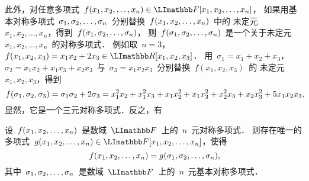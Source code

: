 此外，对任意多项式~$f(\mvec x)\in\mF[\mvec x]$，
如果用基本对称多项式~${\sigma}_1,\allowbreak{\sigma}_2,\allowbreak\dotsc,\allowbreak{\sigma}_{n}$~分别替换~$f({x}_1,\allowbreak{x}_2,\allowbreak\dotsc,\allowbreak{x}_{n})$~中的
未定元~$x_1,x_2,\dotsc,x_n$，得到~$f({\sigma}_1,\allowbreak{\sigma}_2,\allowbreak\dotsc,\allowbreak{\sigma}_{n})$，
则~$f({\sigma}_1,\allowbreak{\sigma}_2,\allowbreak\dotsc,\allowbreak{\sigma}_{n})$~是一个关于未定元~$x_1,x_2,\dotsc,x_n$~的对称多项式．%
例如取~$n=3$，$f(x_1,x_2,x_3)=x_1x_2+2x_3\in\mR[x_1,x_2,x_3]$．%
用~$\sigma_1=x_1+x_2+x_3$，$\sigma_2=x_1x_2+x_1x_3+x_2x_3$~与~$\sigma_3=x_1x_2x_3$~分别替换~$f(x_1,x_2,x_3)$~的
未定元~$x_1,x_2,x_3$，得到
\[
f(\sigma_1,\sigma_2,\sigma_3)=\sigma_1\sigma_2+2\sigma_3=x_1^2x_2+x_1^2x_3+x_1x_2^2+x_1x_3^2+x_2^2x_3+x_2x_3^2+5x_1x_2x_3\cid
\]
显然，它是一个三元对称多项式．反之，有
\begin{theorem}[对称多项式基本定理]\label{sym-pol-onlyone}
设~$f({x}_1,\allowbreak{x}_2,\allowbreak\dotsc,\allowbreak{x}_{n})$~是数域~$\mF$~上的~$n$~元对称多项式．%
则存在唯一的多项式~$g(\mvec x)\in\mF[\mvec x]$，使得
\[
f(\mvec x)=g(\mvec\sigma)\cid
\]
其中~${\sigma}_1,\allowbreak{\sigma}_2,\allowbreak\dotsc,\allowbreak{\sigma}_{n}$~是数域~$\mF$~上的~$n$~元基本对称多项式．
\end{theorem}
